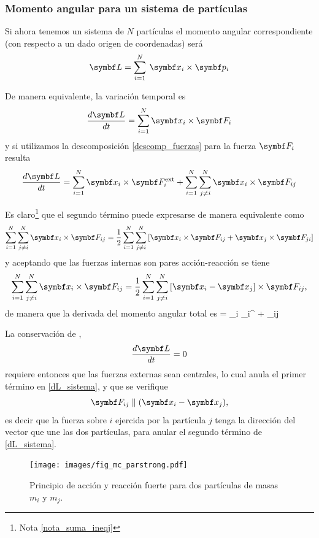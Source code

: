 \documentclass[10pt,oneside]{CBFT_book}
\begin{document}
\subsubsection{Momento angular para un sistema de partículas}

Si ahora tenemos un sistema de $N$ partículas el momento angular correspondiente (con respecto a un dado origen de
coordenadas) será
\[
	\vb{L} = \Sum{i=1}{N} \: \vb{x}_i \times \vb{p}_i
\]

De manera equivalente, la variación temporal es 
\[
	\dtot{\vb{L}}{t} = \Sum{i=1}{N} \vb{x}_i \times \vb{F}_i
\]
y si utilizamos la descomposición \eqref{descomp_fuerzas} para la fuerza $\vb{F}_i$ resulta
\[
	\dtot{\vb{L}}{t} = \Sum{i=1}{N} \vb{x}_i \times \vb{F}_i^\text{ext}  +
	\Sum{i=1}{N} \Sum{j\neq i}{N}  \vb{x}_i \times \vb{F}_{ij}
\]

Es claro\footnote{Nota \ref{nota_suma_ineqj}} que el segundo término puede expresarse de manera equivalente como 
\[
	\Sum{i=1}{N} \Sum{j\neq i}{N}  \vb{x}_i \times \vb{F}_{ij} =
	\frac{1}{2} 
	\Sum{i=1}{N} \Sum{j \neq i}{N}  \left[ \vb{x}_i \times \vb{F}_{ij} + \vb{x}_j \times \vb{F}_{ji} \right]
\]
y aceptando que las fuerzas internas son pares acción-reacción se tiene 
\[
	\Sum{i=1}{N} \Sum{j\neq i}{N}  \vb{x}_i \times \vb{F}_{ij} =
	\frac{1}{2} 
	\Sum{i=1}{N} \Sum{j \neq i}{N}  \left[ \vb{x}_i - \vb{x}_j \right] \times \vb{F}_{ij},
\]
de manera que la derivada del momento angular total es 
\be
	 =  _i \times {}_i^  +
	    \left[ \vb{x}_i - \vb{x}_j \right] \times {}_{ij} 
	\label{dL_sistema}
\ee

La conservación de ,
\[
	\dtot{\vb{L}}{t} = 0	
\]
requiere entonces que las fuerzas externas sean centrales, lo cual anula el primer término en \eqref{dL_sistema},
y que se verifique 
\[
	\vb{F}_{ij}  \parallel ( \vb{x}_i - \vb{x}_j ),
\]
es decir que la fuerza sobre $i$ ejercida por la partícula $j$ tenga la dirección del vector que une las dos 
partículas, para anular el segundo término de \eqref{dL_sistema}.

\begin{figure}[htb]
	\begin{center}
	\texttt{[image: images/fig\_mc\_parstrong.pdf]}	
	\end{center}
	\caption{Principio de acción y reacción fuerte para dos partículas de masas $m_i$ y $m_j$.}
	\label{fig_mc_parstrong}
\end{figure} 
\end{document}
